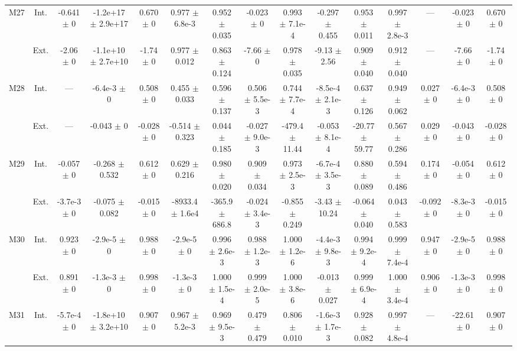 \begin{table}[htbp]
{\begin{tabular}{@{}ccccccccccccccc@{}}
\cline{2-15}
\multirow{2}{*}{M27} & Int. & -0.641 $\pm$ 0 & -1.2e+17 $\pm$ 2.9e+17 & 0.670 $\pm$ 0 & 0.977 $\pm$ 6.8e-3 & 0.952 $\pm$ 0.035 & -0.023 $\pm$ 0 & 0.993 $\pm$ 7.1e-4 & -0.297 $\pm$ 0.455 & 0.953 $\pm$ 0.011 & 0.997 $\pm$ 2.8e-3 & --- & -0.023 $\pm$ 0 & 0.670 $\pm$ 0 \\
 & Ext. & -2.06 $\pm$ 0 & -1.1e+10 $\pm$ 2.7e+10 & -1.74 $\pm$ 0 & 0.977 $\pm$ 0.012 & 0.863 $\pm$ 0.124 & -7.66 $\pm$ 0 & 0.978 $\pm$ 0.035 & -9.13 $\pm$ 2.56 & 0.909 $\pm$ 0.040 & 0.912 $\pm$ 0.040 & --- & -7.66 $\pm$ 0 & -1.74 $\pm$ 0 \\
\cline{2-15}
\multirow{2}{*}{M28} & Int. & --- & -6.4e-3 $\pm$ 0 & 0.508 $\pm$ 0 & 0.455 $\pm$ 0.033 & 0.596 $\pm$ 0.137 & 0.506 $\pm$ 5.5e-3 & 0.744 $\pm$ 7.7e-4 & -8.5e-4 $\pm$ 2.1e-3 & 0.637 $\pm$ 0.126 & 0.949 $\pm$ 0.062 & 0.027 $\pm$ 0 & -6.4e-3 $\pm$ 0 & 0.508 $\pm$ 0 \\
 & Ext. & --- & -0.043 $\pm$ 0 & -0.028 $\pm$ 0 & -0.514 $\pm$ 0.323 & 0.044 $\pm$ 0.185 & -0.027 $\pm$ 9.0e-3 & -479.4 $\pm$ 11.44 & -0.053 $\pm$ 8.1e-4 & -20.77 $\pm$ 59.77 & 0.567 $\pm$ 0.286 & 0.029 $\pm$ 0 & -0.043 $\pm$ 0 & -0.028 $\pm$ 0 \\
\cline{2-15}
\multirow{2}{*}{M29} & Int. & -0.057 $\pm$ 0 & -0.268 $\pm$ 0.532 & 0.612 $\pm$ 0 & 0.629 $\pm$ 0.216 & 0.980 $\pm$ 0.020 & 0.909 $\pm$ 0.034 & 0.973 $\pm$ 2.5e-3 & -6.7e-4 $\pm$ 3.5e-3 & 0.880 $\pm$ 0.089 & 0.594 $\pm$ 0.486 & 0.174 $\pm$ 0 & -0.054 $\pm$ 0 & 0.612 $\pm$ 0 \\
 & Ext. & -3.7e-3 $\pm$ 0 & -0.075 $\pm$ 0.082 & -0.015 $\pm$ 0 & -8933.4 $\pm$ 1.6e4 & -365.9 $\pm$ 686.8 & -0.024 $\pm$ 3.4e-3 & -0.855 $\pm$ 0.249 & -3.43 $\pm$ 10.24 & -0.064 $\pm$ 0.040 & 0.043 $\pm$ 0.583 & -0.092 $\pm$ 0 & -8.3e-3 $\pm$ 0 & -0.015 $\pm$ 0 \\
\cline{2-15}
\multirow{2}{*}{M30} & Int. & 0.923 $\pm$ 0 & -2.9e-5 $\pm$ 0 & 0.988 $\pm$ 0 & -2.9e-5 $\pm$ 0 & 0.996 $\pm$ 2.6e-3 & 0.988 $\pm$ 1.2e-3 & 1.000 $\pm$ 1.2e-6 & -4.4e-3 $\pm$ 9.8e-3 & 0.994 $\pm$ 9.2e-4 & 0.999 $\pm$ 7.4e-4 & 0.947 $\pm$ 0 & -2.9e-5 $\pm$ 0 & 0.988 $\pm$ 0 \\
 & Ext. & 0.891 $\pm$ 0 & -1.3e-3 $\pm$ 0 & 0.998 $\pm$ 0 & -1.3e-3 $\pm$ 0 & 1.000 $\pm$ 1.5e-4 & 0.999 $\pm$ 2.0e-5 & 1.000 $\pm$ 3.8e-6 & -0.013 $\pm$ 0.027 & 0.999 $\pm$ 6.9e-4 & 1.000 $\pm$ 3.4e-4 & 0.906 $\pm$ 0 & -1.3e-3 $\pm$ 0 & 0.998 $\pm$ 0 \\
\cline{2-15}
\multirow{2}{*}{M31} & Int. & -5.7e-4 $\pm$ 0 & -1.8e+10 $\pm$ 3.2e+10 & 0.907 $\pm$ 0 & 0.967 $\pm$ 5.2e-3 & 0.969 $\pm$ 9.5e-3 & 0.479 $\pm$ 0.479 & 0.806 $\pm$ 0.010 & -1.6e-3 $\pm$ 1.7e-3 & 0.928 $\pm$ 0.082 & 0.997 $\pm$ 4.8e-4 & --- & -22.61 $\pm$ 0 & 0.907 $\pm$ 0 \\

\end{tabular}}
\end{table}
